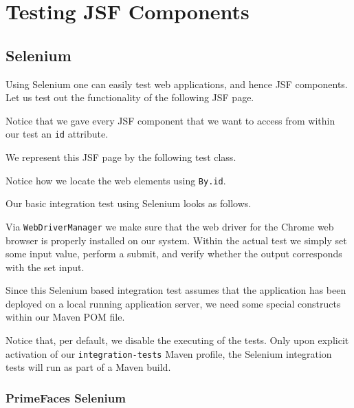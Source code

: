 %

\chapter{Testing JSF Components}

\section{Selenium}
Using Selenium \cite{selenium} one can easily test web applications, and hence JSF components.
Let us test out the functionality of the following JSF page.

Notice that we gave every JSF component that we want to access from within our test an \texttt{id} attribute.

We represent this JSF page by the following test class.

Notice how we locate the web elements using \texttt{By.id}.

Our basic integration test using Selenium looks as follows.

Via \texttt{WebDriverManager} we make sure that the web driver \cite{webdriver} for the Chrome web browser is properly installed on our system.
Within the actual test we simply set some input value, perform a submit, and verify whether the output corresponds with the set input.

Since this Selenium based integration test assumes that the application has been deployed on a local running application server, we need some special constructs within our Maven POM file.

Notice that, per default, we disable the executing of the tests.
Only upon explicit activation of our \texttt{integration-tests} Maven profile,
the Selenium integration tests will run as part of a Maven build.

\subsection{PrimeFaces Selenium}

